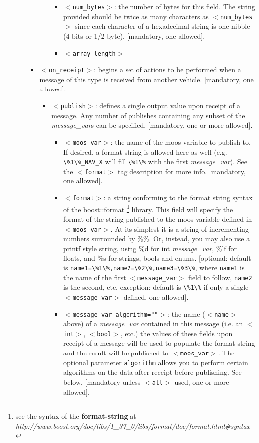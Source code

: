 \documentclass[11pt, letterpaper, oneside]{memoir}
\newcommand{\xmltag}[1]{\texttt{$<$#1$>$}}
\begin{document}
\begin{itemize}
\begin{itemize}
\begin{itemize}
\begin{itemize}
\begin{itemize}
\item \xmltag{num\_bytes}: the number of bytes for this field. The string provided should be twice as many characters as \xmltag{num\_bytes} since each character of a hexadecimal string is one nibble (4 bits or 1/2 byte). [mandatory, one allowed].
\item \xmltag{array\_length}
\end{itemize}
\end{itemize}
\item \xmltag{on\_receipt}: begins a set of actions to be performed when a message of this type is received from another vehicle. [mandatory, one allowed].
\begin{itemize}
\item \xmltag{publish}: defines a single output value upon receipt of a message. Any number of publishes containing any subset of the \textit{message\_var}s can be specified. [mandatory, one or more allowed].
\begin{itemize}
\item \xmltag{moos\_var}: the name of the moos variable to publish to. If desired, a format string is allowed here as well (e.g. \verb|\%1\%_NAV_X| will fill \verb|\%1\%| with the first \textit{message\_var}). See the \xmltag{format} tag description for more info. [mandatory, one allowed].
\item \xmltag{format}: a string conforming to the format string syntax of the boost::format \footnote{see the syntax of the \textbf{format-string} at \textit{http://www.boost.org/doc/libs/1\_37\_0/libs/format/doc/format.html\#syntax}} library. This field will specify the format of the string published to the moos variable defined in \xmltag{moos\_var}. At its simplest it is a string of incrementing numbers surrounded by \%\%. Or, instead, you may also use a printf style string, using \%d for int  \textit{message\_var}, \%lf for floats, and \%s for strings, bools and enums. [optional: default is \verb|name1=\%1\%,name2=\%2\%,name3=\%3\%|, where \verb|name1| is the name of the first \xmltag{message\_var} field to follow, \verb|name2| is the second, etc. exception: default is \verb|\%1\%| if only a single \xmltag{message\_var} defined. one allowed].
\item \xmltag{message\_var algorithm=""}: the name (\xmltag{name} above) of a \textit{message\_var} contained in this message (i.e. an \xmltag{int}, \xmltag{bool}, etc.) the values of these fields upon receipt of a message will be used to populate the format string and the result will be published to \xmltag{moos\_var}. The optional parameter \verb|algorithm| allows you to perform certain algorithms on the data after receipt before publishing. See below. [mandatory unless \xmltag{all} used, one or more allowed].

\end{itemize}
\end{itemize}
\end{itemize}
\end{itemize}
\end{itemize}
\end{document}
